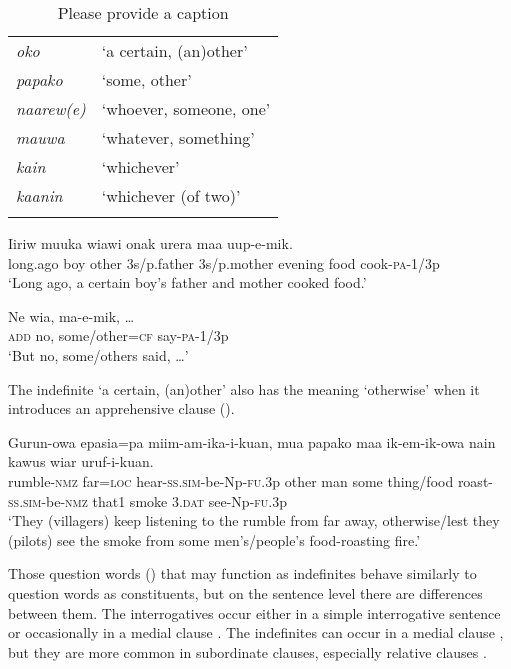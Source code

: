 \begin{table}
\caption{Please provide a caption}
\label{} 
\begin{tabular}{>{\itshape}ll}
\mytoprule
oko &`a certain, (an)other'\\
papako &`some, other'\\
naarew(e) &`whoever, someone, one'\\
mauwa &`whatever, something'\\
kain &`whichever'\\
kaanin &`whichever (of two)'\\
\mybottomrule
\end{tabular}
\end{table}


\ea%
\label{ex:3:x641}
\gll Iiriw muuka  wiawi onak urera maa uup-e-mik.\\
long.ago boy other 3s/p.father 3s/p.mother evening food cook-\textsc{pa}-1/3p\\
\glt`Long ago, a certain boy's father and mother cooked food.'
\z

\ea%
\label{ex:3:x642}
\gll Ne wia,  ma-e-mik, {\dots} \\
\textsc{add} no, some/other=\textsc{cf} say-\textsc{pa}-1/3p\\
\glt`But no, some/others said, {\dots}'
\z

The indefinite  `a certain, (an)other' also has the meaning `otherwise' when it introduces an apprehensive clause ().

\ea%
\label{ex:3:x741}
\gll Gurun-owa epasia=pa miim-am-ika-i-kuan,  mua papako maa ik-em-ik-owa nain kawus wiar uruf-i-kuan.\\
rumble-\textsc{nmz} far=\textsc{loc} hear-\textsc{ss}.\textsc{sim}-be-Np-\textsc{fu}.3p other man some thing/food roast-\textsc{ss}.\textsc{sim}-be-\textsc{nmz} that1 smoke 3.\textsc{dat} see-Np-\textsc{fu}.3p\\
\glt`They (villagers) keep listening to the rumble from far away, otherwise/lest they (pilots) see the smoke from some men's/people's food-roasting fire.'
\z

Those question words () that may function as indefinites behave similarly to question words as  constituents, but on the sentence level there are differences between them. The interrogatives occur either in a simple interrogative sentence or occasionally in a medial clause . The indefinites can occur in a medial clause , but they are more common in subordinate clauses, especially relative clauses . 

